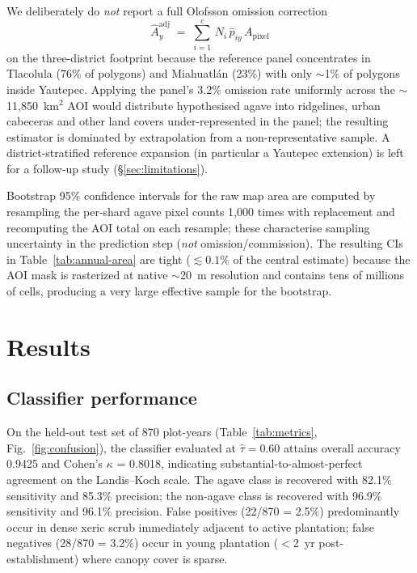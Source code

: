 \documentclass[10pt,a4paper]{article}
\begin{document}
We deliberately do \emph{not} report a full Olofsson omission
correction \citep{olofsson2014good}
\begin{equation}\label{eq:olofsson-area}
  \hat{A}^{\mathrm{adj}}_{y} \;=\; \sum_{i=1}^{c}\, N_{i}\,\hat{p}_{iy}\,A_{\mathrm{pixel}}
\end{equation}
on the three-district footprint because the reference panel
concentrates in Tlacolula (76\% of polygons) and Miahuatlán (23\%)
with only $\sim$1\% of polygons inside Yautepec. Applying the
panel's 3.2\% omission rate uniformly across the
$\sim$11{,}850~km$^2$ AOI would distribute hypothesised agave into
ridgelines, urban cabeceras and other land covers under-represented
in the panel; the resulting estimator is dominated by extrapolation
from a non-representative sample. A district-stratified reference
expansion (in particular a Yautepec extension) is left for a
follow-up study (\S\ref{sec:limitations}).

Bootstrap 95\% confidence intervals for the raw map area are
computed by resampling the per-shard agave pixel counts 1{,}000
times with replacement and recomputing the AOI total on each
resample; these characterise sampling uncertainty in the prediction
step (\textit{not} omission/commission). The resulting CIs in
Table~\ref{tab:annual-area} are tight ($\lesssim 0.1\%$ of the
central estimate) because the AOI mask is rasterized at native
$\sim$20~m resolution and contains tens of millions of cells,
producing a very large effective sample for the bootstrap.

\section{Results}\label{sec:results}

\subsection{Classifier performance}

On the held-out test set of 870 plot-years
(Table~\ref{tab:metrics}, Fig.~\ref{fig:confusion}), the classifier
evaluated at $\hat{\tau} = 0.60$ attains overall accuracy 0.9425 and
Cohen's $\kappa$ = 0.8018, indicating substantial-to-almost-perfect
agreement on the Landis--Koch scale. The agave class is recovered
with 82.1\% sensitivity and 85.3\% precision; the non-agave class
is recovered with 96.9\% sensitivity and 96.1\% precision. False
positives (22/870 = 2.5\%) predominantly occur in dense xeric scrub
immediately adjacent to active plantation; false negatives (28/870
= 3.2\%) occur in young plantation ($<$2~yr post-establishment)
where canopy cover is sparse.
\end{document}
